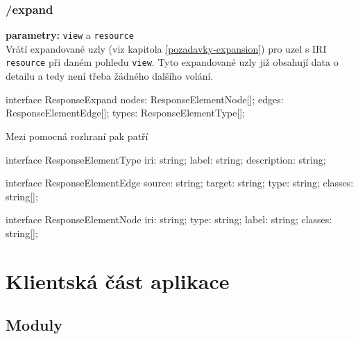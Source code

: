 \subsubsection{/expand}
\textbf{parametry:} \texttt{view} a \texttt{resource} \\
Vrátí expandované uzly (viz kapitola \ref{pozadavky-expansion}) pro uzel s IRI \texttt{resource} při daném pohledu \texttt{view}. Tyto expandované uzly již obsahují data o detailu a tedy není třeba žádného dalšího volání.

\begin{code}
interface ResponseExpand {
    nodes: ResponseElementNode[];
    edges: ResponseElementEdge[];
    types: ResponseElementType[];
}
\end{code}

\newpage

Mezi pomocná rozhraní pak patří
\begin{code}
interface ResponseElementType {
    iri: string;
    label: string;
    description: string;
}

interface ResponseElementEdge {
    source: string;
    target: string;
    type: string;
    classes: string[];
}

interface ResponseElementNode {
    iri: string;
    type: string;
    label: string;
    classes: string[];
}
\end{code}

\section{Klientská část aplikace}

\subsection{Moduly}

